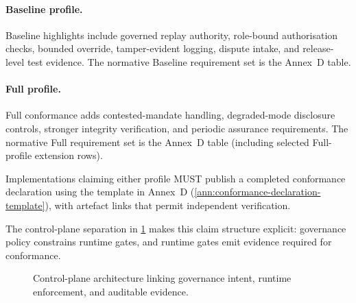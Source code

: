\documentclass[11pt]{article}
\theoremstyle{definition}
\theoremstyle{plain}
\theoremstyle{remark}
\begin{document}
\paragraph{Baseline profile.}
Baseline highlights include governed replay authority, role-bound authorisation checks, bounded override, tamper-evident logging, dispute intake, and release-level test evidence.
The normative Baseline requirement set is the Annex~D table.

\paragraph{Full profile.}
Full conformance adds contested-mandate handling, degraded-mode disclosure controls, stronger integrity verification,
and periodic assurance requirements.
The normative Full requirement set is the Annex~D table (including selected Full-profile extension rows).

Implementations claiming either profile MUST publish a completed conformance declaration using the
template in Annex~D (\cref{ann:conformance-declaration-template}), with artefact links that permit
independent verification.

The control-plane separation in \cref{fig:control-plane-architecture} makes this claim structure explicit:
governance policy constrains runtime gates, and runtime gates emit evidence required for conformance.

\begin{figure}[htbp]
\centering
{}
\caption{Control-plane architecture linking governance intent, runtime enforcement, and auditable evidence.}
\label{fig:control-plane-architecture}
\end{figure}
\end{document}
